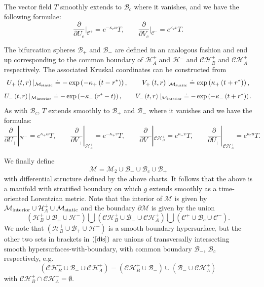 \documentclass[A4,10pt]{article}
\begin{document}
The vector field $T$ smoothly extends to $\mathcal{B}_c$ 
where it vanishes, and we have the following formulae:
\[\frac{\partial}{\partial U_c}\Big|_{\mathcal{C}^+} = e^{-\kappa_cu}T,\qquad \frac{\partial}{\partial V_c}\Big|_{\mathcal{C}^-} = e^{\kappa_cv}T.\]


The bifurcation spheres $\mathcal{B}_+$ and $\mathcal{B}_-$ are defined in an analogous fashion and end up corresponding to the common boundary of $\mathcal{H}^+_A$ and $\mathcal{H}^-$ and $\mathcal{CH}^+_B$ and $\mathcal{CH}^+_A$ respectively. The associated Kruskal coordinates can be constructed from 
\begin{equation}\label{kruskalplus}
U_+\left(t,r\right)|_{\mathcal{M}_{{\rm static}}} \doteq -\exp\left(-\kappa_+\left(t-r^*\right)\right),\qquad V_+\left(t,r\right)|_{\mathcal{M}_{{\rm static}}} \doteq \exp\left(\kappa_+\left(t+r^*\right)\right),
\end{equation}
\begin{equation}\label{kruskalminus}
U_-\left(t,r\right)|_{\mathcal{M}_{{\rm interior}}} \doteq -\exp\left(-\kappa_-\left(r^*-t\right)\right),\qquad V_-\left(t,r\right)|_{\mathcal{M}_{{\rm interior}}} \doteq -\exp\left(-\kappa_-\left(t+r^*\right)\right).
\end{equation}
As with $\mathcal{B}_c$, $T$ extends smoothly to $\mathcal{B}_+$ and $\mathcal{B}_-$ where it vanishes and we have the formulas:
\begin{equation}\label{Tform}
\frac{\partial}{\partial U_+}|_{\mathcal{H}^-} = e^{\kappa_+u}T,\qquad \frac{\partial}{\partial V_+}|_{\mathcal{H}^+_A} = e^{-\kappa_+v}T,\qquad \frac{\partial}{\partial V_-}|_{\mathcal{CH}^+_B} = e^{\kappa_-v}T,\qquad \frac{\partial}{\partial U_+}|_{\mathcal{CH}^+_A} = e^{\kappa_cu}T.
\end{equation}


We finally define
\begin{equation}
\label{thisisM}
\mathcal{M}=\mathcal{M}_2 \cup\mathcal{B}_-\cup\mathcal{B}_c\cup\mathcal{B}_+
\end{equation}
with differential structure defined by the 
above charts. It follows that
the above is a manifold with stratified boundary on which
 $g$ extends smoothly as a time-oriented Lorentzian metric.
Note that the interior of $\mathcal{M}$ is given by $\mathcal{M}_{\rm interior}\cup
\mathcal{H}^+_A\cup\mathcal{M}_{\rm static}$ and the boundary 
$\partial\mathcal{M}$ is given by the union
\begin{equation}
\label{dis}
\left(\mathcal{H}^+_B\cup\mathcal{B}_+\cup\mathcal{H}^-\right)\bigcup
\left(\mathcal{CH}^+_B\cup\mathcal{B}_-\cup\mathcal{CH}^+_A\right)\bigcup
\left(\mathcal{C}^+\cup\mathcal{B}_c\cup\mathcal{C}^-\right).
\end{equation}
We note that $\left(\mathcal{H}^+_B\cup\mathcal{B}_+\cup\mathcal{H}^-\right)$
is a smooth boundary hypersurface, but the other two sets in brackets in
$(\ref{dis})$ are unions of transversally intersecting smooth hypersurfaces-with-boundary, with
common boundary $\mathcal{B}_-$, $\mathcal{B}_c$ respectively,
e.g.~
\[
\left(\mathcal{CH}^+_B\cup\mathcal{B}_-\cup\mathcal{CH}^+_A\right)=
(\mathcal{CH}^+_B\cup\mathcal{B}_-)\cup 
(\mathcal{B}_-\cup\mathcal{CH}^+_A)
\]
with $\mathcal{CH}^+_B\cap\mathcal{CH}^+_A=\emptyset$.
\end{document}
